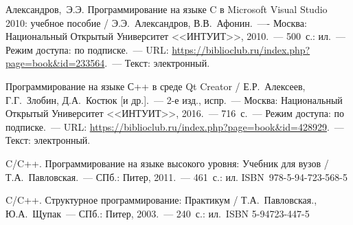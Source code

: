 \documentclass[main.tex]{subfiles}
\begin{document}

\begin{thebibliography}{x}
     Александров,~Э.Э. Программирование на языке C в Microsoft Visual Studio 2010: учебное пособие / Э.Э.~Александров, В.В.~Афонин.~---- Москва: Национальный Открытый Университет <<ИНТУИТ>>, 2010.~--- 500~с.: ил.~--- Режим доступа: по подписке.~--- URL: \href{https://biblioclub.ru/index.php?page=book&id=233564}{https://biblioclub.ru/index.php?page=book\&id=233564}.~--- Текст: электронный.

     Программирование на языке С++ в среде Qt Creator / Е.Р.~Алексеев, Г.Г.~Злобин, Д.А.~Костюк [и др.].~--- 2-е изд., испр.~--- Москва: Национальный Открытый Университет <<ИНТУИТ>>, 2016.~--- 716~с.~--- Режим доступа: по подписке.~--- URL: \href{https://biblioclub.ru/index.php?page=book&id=428929}{https://biblioclub.ru/index.php?page=book\&id=428929}.~--- Текст: электронный.

     C/C++. Программирование на языке высокого уровня: Учебник для вузов / Т.А.~Павловская.~--- СПб.: Питер, 2011.~--- 461~с.: ил. ISBN~978-5-94-723-568-5

     C/C++. Структурное программирование: Практикум / Т.А.~Павловская., Ю.А.~Щупак~--- СПб.: Питер, 2003.~--- 240~с.: ил.~ISBN 5-94723-447-5
\end{thebibliography}  
\end{document}
